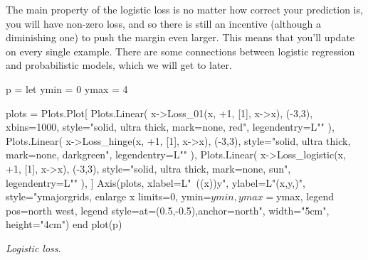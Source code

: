 The main property of the logistic loss is no matter how correct your prediction is, you will have non-zero loss,
and so there is still an incentive (although a diminishing one) to push the margin even larger.
This means that you'll update on every single example.
There are some connections between logistic regression and probabilistic models, which we will get to later.
\begin{marginfigure}
  \begin{jlcode}
    p = let
        ymin = 0
        ymax = 4

        plots = Plots.Plot[
            Plots.Linear(
                x->Loss_01(x, +1, [1], x->x), (-3,3), xbins=1000, style="solid, ultra thick, mark=none, red", legendentry=L"\ZeroOneLoss"
            ),
            Plots.Linear(
                x->Loss_hinge(x, +1, [1], x->x), (-3,3), style="solid, ultra thick, mark=none, darkgreen", legendentry=L"\HingeLoss"
            ),
            Plots.Linear(
                x->Loss_logistic(x, +1, [1], x->x), (-3,3), style="solid, ultra thick, mark=none, sun", legendentry=L"\LogisticLoss"
            ),
        ]
        Axis(plots,
             xlabel=L"~(\cdot\phi(x))y",
             ylabel=L"\Loss(x,y,)",
             style="ymajorgrids, enlarge x limits=0, ymin=$ymin, ymax=$ymax, legend pos=north west, legend style={at={(0.5,-0.5)},anchor=north}",
             width="5cm", height="4cm")
    end
    plot(p)
  \end{jlcode}
  \begin{center}
  \end{center}
  \caption{
    \label{fig:logistic_loss} \textit{Logistic loss}.
  }
\end{marginfigure}

\pagebreak

